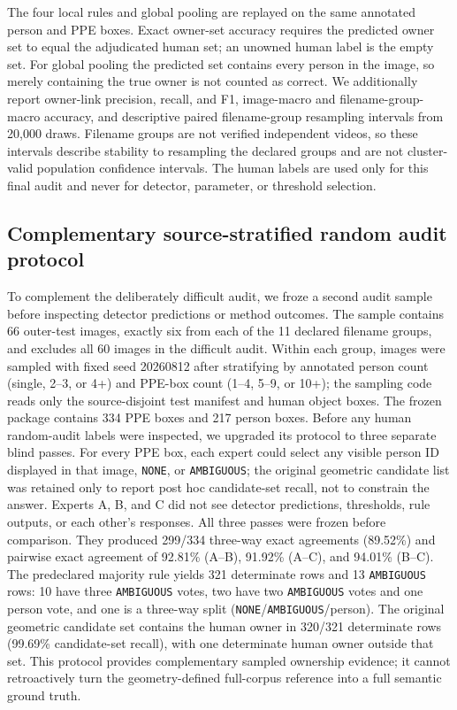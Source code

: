 \documentclass[iicol,pdflatex,sn-mathphys-num]{sn-jnl}
\begin{document}
The four local rules and global pooling are replayed on the same annotated person and PPE boxes. Exact owner-set accuracy requires the predicted owner set to equal the adjudicated human set; an unowned human label is the empty set. For global pooling the predicted set contains every person in the image, so merely containing the true owner is not counted as correct. We additionally report owner-link precision, recall, and F1, image-macro and filename-group-macro accuracy, and descriptive paired filename-group resampling intervals from 20,000 draws. Filename groups are not verified independent videos, so these intervals describe stability to resampling the declared groups and are not cluster-valid population confidence intervals. The human labels are used only for this final audit and never for detector, parameter, or threshold selection.

\subsection{Complementary source-stratified random audit protocol}
To complement the deliberately difficult audit, we froze a second audit sample before inspecting detector predictions or method outcomes. The sample contains 66 outer-test images, exactly six from each of the 11 declared filename groups, and excludes all 60 images in the difficult audit. Within each group, images were sampled with fixed seed 20260812 after stratifying by annotated person count (single, 2--3, or 4+) and PPE-box count (1--4, 5--9, or 10+); the sampling code reads only the source-disjoint test manifest and human object boxes. The frozen package contains 334 PPE boxes and 217 person boxes. Before any human random-audit labels were inspected, we upgraded its protocol to three separate blind passes. For every PPE box, each expert could select any visible person ID displayed in that image, \texttt{NONE}, or \texttt{AMBIGUOUS}; the original geometric candidate list was retained only to report post hoc candidate-set recall, not to constrain the answer. Experts A, B, and C did not see detector predictions, thresholds, rule outputs, or each other's responses. All three passes were frozen before comparison. They produced 299/334 three-way exact agreements (89.52\%) and pairwise exact agreement of 92.81\% (A--B), 91.92\% (A--C), and 94.01\% (B--C). The predeclared majority rule yields 321 determinate rows and 13 \texttt{AMBIGUOUS} rows: 10 have three \texttt{AMBIGUOUS} votes, two have two \texttt{AMBIGUOUS} votes and one person vote, and one is a three-way split (\texttt{NONE}/\texttt{AMBIGUOUS}/person). The original geometric candidate set contains the human owner in 320/321 determinate rows (99.69\% candidate-set recall), with one determinate human owner outside that set. This protocol provides complementary sampled ownership evidence; it cannot retroactively turn the geometry-defined full-corpus reference into a full semantic ground truth.
\end{document}

